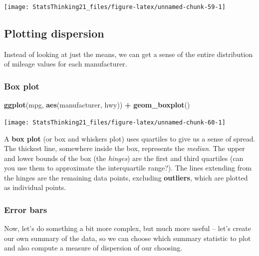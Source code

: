 \documentclass[
  12pt,
]{book}
\newenvironment{Shaded}{\begin{snugshade}}{\end{snugshade}}
\newcommand{\FunctionTok}[1]{\textcolor[rgb]{0.13,0.29,0.53}{\textbf{#1}}}
\newcommand{\NormalTok}[1]{#1}
\newcommand{\SpecialCharTok}[1]{\textcolor[rgb]{0.81,0.36,0.00}{\textbf{#1}}}
\begin{document}
\texttt{[image: StatsThinking21\_files/figure-latex/unnamed-chunk-59-1]}

\hypertarget{plotting-dispersion}{%
\subsection{Plotting dispersion}\label{plotting-dispersion}}

Instead of looking at just the means, we can get a sense of the entire distribution of mileage values for each manufacturer.

\hypertarget{box-plot}{%
\subsubsection{Box plot}\label{box-plot}}

\begin{Shaded}
\begin{Highlighting}[]
\FunctionTok{ggplot}\NormalTok{(mpg, }\FunctionTok{aes}\NormalTok{(manufacturer, hwy)) }\SpecialCharTok{+}
  \FunctionTok{geom\_boxplot}\NormalTok{()}
\end{Highlighting}
\end{Shaded}

\texttt{[image: StatsThinking21\_files/figure-latex/unnamed-chunk-60-1]}

A \textbf{box plot} (or box and whiskers plot) uses quartiles to give us a sense of spread. The thickest line, somewhere inside the box, represents the \emph{median}. The upper and lower bounds of the box (the \emph{hinges}) are the first and third quartiles (can you use them to approximate the interquartile range?). The lines extending from the hinges are the remaining data points, excluding \textbf{outliers}, which are plotted as individual points.

\hypertarget{error-bars}{%
\subsubsection{Error bars}\label{error-bars}}

Now, let's do something a bit more complex, but much more useful -- let's create our own summary of the data, so we can choose which summary statistic to plot and also compute a measure of dispersion of our choosing.
\end{document}
